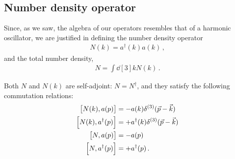 \documentclass[main.tex]{subfiles}
\begin{document}
\subsection{Number density operator}

Since, as we saw, the algebra of our operators resembles that of a harmonic oscillator, we are justified in defining the number density operator
%
\begin{align}
N(k) = a ^\dag  (k) a(k)
\,,
\end{align}
%
and the total number density, 
%
\begin{align}
N = \int \dd[3]{k} N(k)
\,.
\end{align}

\begin{claim}
Both \(N\) and \(N(k)\) are self-adjoint: \(N = N ^\dag\), and they satisfy the following commutation relations: 
%
\begin{subequations}
\begin{align} \label{eq:commutation-relations-number}
\qty[N(k), a(p)] &= - a(k) \delta^{(3)}(\vec{p} - \vec{k}) \\
\qty[N(k), a ^\dag(p)] &= + a ^\dag(k) \delta^{(3)}(\vec{p} - \vec{k}) \\
\qty[N, a(p)] &= - a(p)  \\
\qty[N, a ^\dag(p)] &= + a ^\dag(p)  
\,.
\end{align}
\end{subequations}
\end{claim}

\end{document}
